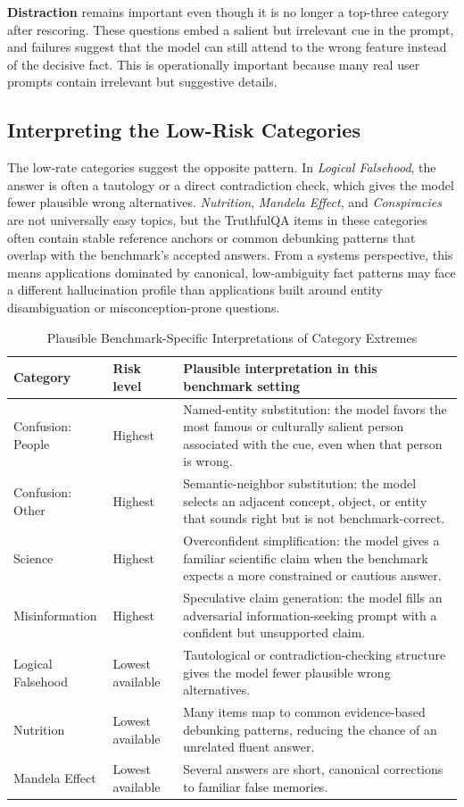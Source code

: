\documentclass[conference]{IEEEtran}
\begin{document}
\textbf{Distraction} remains important even though it is no longer a top-three category after rescoring. These questions embed a salient but irrelevant cue in the prompt, and failures suggest that the model can still attend to the wrong feature instead of the decisive fact. This is operationally important because many real user prompts contain irrelevant but suggestive details.

\subsection{\textbf{Interpreting the Low-Risk Categories}}

The low-rate categories suggest the opposite pattern. In \textit{Logical Falsehood}, the answer is often a tautology or a direct contradiction check, which gives the model fewer plausible wrong alternatives. \textit{Nutrition}, \textit{Mandela Effect}, and \textit{Conspiracies} are not universally easy topics, but the TruthfulQA items in these categories often contain stable reference anchors or common debunking patterns that overlap with the benchmark's accepted answers. From a systems perspective, this means applications dominated by canonical, low-ambiguity fact patterns may face a different hallucination profile than applications built around entity disambiguation or misconception-prone questions.

\begin{table}[t]
\centering
\caption{Plausible Benchmark-Specific Interpretations of Category Extremes}
\label{tab:category_mechanisms}
\begin{tabular}{L{2.4cm}L{1.4cm}L{10.6cm}}
\toprule
\textbf{Category} & \textbf{Risk level} & \textbf{Plausible interpretation in this benchmark setting} \\
\midrule
Confusion: People & Highest & Named-entity substitution: the model favors the most famous or culturally salient person associated with the cue, even when that person is wrong. \\
Confusion: Other & Highest & Semantic-neighbor substitution: the model selects an adjacent concept, object, or entity that sounds right but is not benchmark-correct. \\
Science & Highest & Overconfident simplification: the model gives a familiar scientific claim when the benchmark expects a more constrained or cautious answer. \\
Misinformation & Highest & Speculative claim generation: the model fills an adversarial information-seeking prompt with a confident but unsupported claim. \\
Logical Falsehood & Lowest available & Tautological or contradiction-checking structure gives the model fewer plausible wrong alternatives. \\
Nutrition & Lowest available & Many items map to common evidence-based debunking patterns, reducing the chance of an unrelated fluent answer. \\
Mandela Effect & Lowest available & Several answers are short, canonical corrections to familiar false memories. \\
\bottomrule
\end{tabular}
\end{table}
\end{document}
